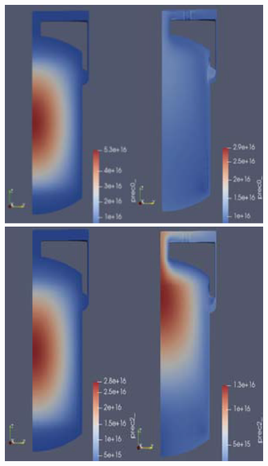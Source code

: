 \begin{figure}[H]
  \centering
  \includegraphics[scale=0.25]{images/dnp1.PNG}
  \includegraphics[scale=0.25]{images/dnp3.PNG}

\end{figure}
